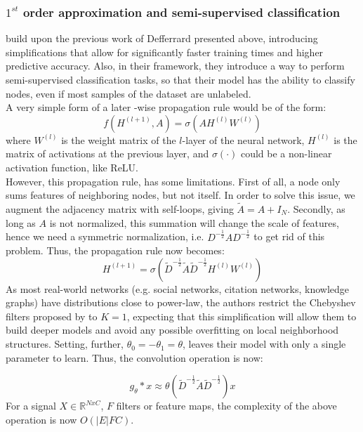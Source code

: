 \subsubsection*{$1^{st}$ order approximation and semi-supervised classification}
\cite{kipf2016semi} build upon the previous work of Defferrard
presented above, introducing simplifications that allow for significantly faster training
times and higher predictive accuracy. Also, in their framework, they introduce a
way to perform semi-supervised classification tasks, so that their model has the
ability to classify nodes, even if most samples of the dataset are unlabeled.\\
A very simple form of a later -wise propagation rule would be of the form:
\begin{equation*}
f(H^{(l+1)},A) = \sigma(AH^{(l)}W^{(l)})
\end{equation*}
where $W^{(l)}$ is the weight matrix of the $l$-layer of the neural network,
$H^{(l)}$ is the matrix of activations at the previous layer, and $\sigma(\cdot
)$ could be  a non-linear activation function, like ReLU.\\
However, this propagation rule, has some limitations. First of all, a node only
sums features of neighboring nodes, but not itself. In order to solve this issue, we augment
the adjacency matrix with self-loops, giving $\widetilde{A} = A + I_N$. Secondly, as
long as $A$ is not normalized, this summation will change the scale of features,
hence we need a symmetric normalization, i.e.
$D^{-\frac{1}{2}}AD^{-\frac{1}{2}}$ to get rid of this problem. Thus, the
propagation rule now becomes:\\
\begin{equation}
H^{(l+1)} =
\sigma(\widetilde{D}^{-\frac{1}{2}}\widetilde{A}\widetilde{D}^{-\frac{1}{2}}H^{(l)}W^{(l)})
\end{equation}
As most real-world networks (e.g. social networks, citation networks, knowledge
graphs) have distributions close to power-law, the authors restrict
the Chebyshev filters proposed by \cite{defferrard2016convolutional} to $K=1$, expecting that this
simplification will allow them to build deeper models and avoid any possible
overfitting on local neighborhood structures. Setting, further, $\theta_0 =
-\theta_1 = \theta$, leaves their model with only a single parameter to learn.
Thus, the convolution operation is now:

\[
g_\theta * x \approx \theta (\widetilde{D}^{-\frac{1}{2}}\widetilde{A}\widetilde{D}^{-\frac{1}{2}})
x
\]
For a signal $X \in \mathbb{R}^{NxC}$, $F$ filters or feature maps, the
complexity of the above operation is now $O(|E|FC)$.\\


